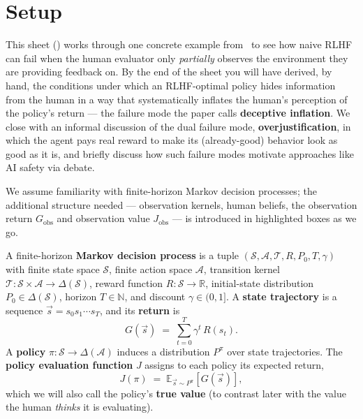\documentclass[11pt]{article}
\newcommand{\cS}{\mathcal{S}}
\newcommand{\cA}{\mathcal{A}}
\newcommand{\cT}{\mathcal{T}}
\newcommand{\E}{\mathbb{E}}
\newcommand{\R}{\mathbb{R}}
\newcommand{\Gobs}{G_{\mathrm{obs}}}
\newcommand{\Jobs}{J_{\mathrm{obs}}}
\begin{document}

\section*{Setup}

This sheet () works through one
concrete example from~\citet{Lang2024PORLHF} to see how naive RLHF can
fail when the human evaluator only \emph{partially} observes the
environment they are providing feedback on. By the end of the sheet you
will have derived, by hand, the conditions under which an RLHF-optimal
policy hides information from the human in a way that systematically
inflates the human's perception of the policy's return --- the failure
mode the paper calls \textbf{deceptive inflation}. We close with an
informal discussion of the dual failure mode, \textbf{overjustification},
in which the agent pays real reward to make its (already-good) behavior
look as good as it is, and briefly discuss how such failure modes
motivate approaches like AI safety via debate.


We assume familiarity with finite-horizon Markov decision processes;
the additional structure needed --- observation kernels, human beliefs,
the observation return $\Gobs$ and observation value $\Jobs$ --- is
introduced in highlighted boxes as we go.


\begin{definition}\label{def:mdp}
A finite-horizon \textbf{Markov decision process} is a tuple
$(\cS, \cA, \cT, R, P_0, T, \gamma)$ with finite state space $\cS$, finite
action space $\cA$, transition kernel
$\cT : \cS \times \cA \to \Delta(\cS)$,
reward function $R : \cS \to \R$, initial-state
distribution $P_0 \in \Delta(\cS)$, horizon $T \in \mathbb{N}$, and discount
$\gamma \in (0,1]$. A \textbf{state trajectory} is a sequence
$\vec s = s_0 s_1 \cdots s_T$, and its \textbf{return} is
$$
G(\vec s) \;=\; \sum_{t=0}^{T} \gamma^{t}\, R(s_t).
$$
A \textbf{policy} $\pi : \cS \to \Delta(\cA)$ induces a distribution $P^\pi$
over state trajectories. The \textbf{policy evaluation function} $J$
assigns to each policy its expected return,
$$
J(\pi) \;=\; \E_{\vec s \sim P^\pi}[G(\vec s)],
$$
which we will also call the policy's \textbf{true value} (to contrast
later with the value the human \emph{thinks} it is evaluating).
\end{definition}
\end{document}
